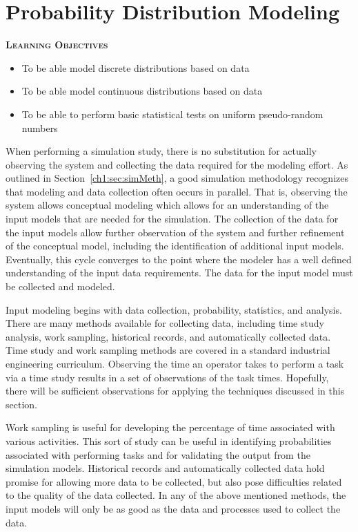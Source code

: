 \documentclass[
]{book}
\theoremstyle{definition}
\theoremstyle{definition}
\theoremstyle{definition}
\theoremstyle{definition}
\theoremstyle{remark}
\begin{document}
\cleardoublepage

\hypertarget{app:idm}{%
\chapter{Probability Distribution Modeling}\label{app:idm}}

\textbf{\textsc{Learning Objectives}}

\begin{itemize}
\item
  To be able model discrete distributions based on data
\item
  To be able model continuous distributions based on data
\item
  To be able to perform basic statistical tests on uniform pseudo-random numbers
\end{itemize}

When performing a simulation study, there is no substitution for
actually observing the system and collecting the data required for the
modeling effort. As outlined in
Section~\ref{ch1:sec:simMeth}, a good simulation methodology recognizes
that modeling and data collection often occurs in parallel. That is,
observing the system allows conceptual modeling which allows for an
understanding of the input models that are needed for the simulation.
The collection of the data for the input models allow further
observation of the system and further refinement of the conceptual
model, including the identification of additional input models.
Eventually, this cycle converges to the point where the modeler has a
well defined understanding of the input data requirements. The data for
the input model must be collected and modeled.

Input modeling begins with data collection, probability, statistics, and
analysis. There are many methods available for collecting data,
including time study analysis, work sampling, historical records, and
automatically collected data. Time study and work sampling methods are
covered in a standard industrial engineering curriculum. Observing the
time an operator takes to perform a task via a time study results in a
set of observations of the task times. Hopefully, there will be
sufficient observations for applying the techniques discussed in this
section.

Work sampling is useful for developing the percentage of time associated
with various activities. This sort of study can be useful in identifying
probabilities associated with performing tasks and for validating the
output from the simulation models. Historical records and automatically
collected data hold promise for allowing more data to be collected, but
also pose difficulties related to the quality of the data collected. In
any of the above mentioned methods, the input models will only be as
good as the data and processes used to collect the data.
\end{document}
